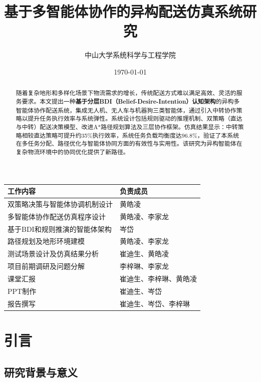 \documentclass[12pt,a4paper]{article}
\title{基于多智能体协作的异构配送仿真系统研究}
\author{中山大学系统科学与工程学院}
\date{\today}
\begin{document}
\maketitle

\begin{table}[h]
\centering

\label{tab:team-division}
\begin{tabular}{|>{\centering\arraybackslash}p{6cm}|>{\centering\arraybackslash}p{8cm}|}
\hline
\textbf{工作内容} & \textbf{负责成员} \\
\hline
\rowcolor{lightgray}
双策略决策与智能体协调机制设计 & 黄皓凌 \\
\hline
多智能体协作配送仿真程序设计 & 黄皓凌、李家龙 \\
\hline
\rowcolor{lightgray}
基于BDI和规则推演的智能体架构 & 岑岱 \\
\hline
路径规划及地形环境建模 & 黄皓凌、李家龙 \\
\hline
\rowcolor{lightgray}
测试场景设计及仿真结果分析 & 崔迪生、黄皓凌 \\
\hline
项目前期调研及问题分解 & 李梓琳、李家龙 \\
\hline
\rowcolor{lightgray}
课堂汇报 & 崔迪生、李梓琳、黄皓凌 \\
\hline
PPT制作 & 崔迪生、岑岱 \\
\hline
\rowcolor{lightgray}
报告撰写 & 崔迪生、岑岱、李梓琳 \\
\hline
\end{tabular}
\end{table}

\begin{abstract}
随着复杂地形和多样化场景下物流需求的增长，传统配送方式难以满足高效、灵活的服务要求。本文提出一种\textbf{基于分层BDI（Belief-Desire-Intention）认知架构}的异构多智能体协作配送系统，集成无人机、无人车与机器狗三类智能体，通过引入中转协作策略以提升任务执行效率与系统弹性。系统设计包括规则驱动的推理机制、双策略（直达与中转）配送决策模型、改进A*路径规划算法及三层协作框架。仿真结果显示：中转策略相较直达策略可提升约35\%执行效率，系统任务负载均衡度达96.8\%，验证了本系统在多任务分配、路径优化与智能体协同方面的有效性与实用性。该研究为异构智能体在复杂物流环境中的协同优化提供了新路径。
\end{abstract}
\clearpage
\tableofcontents
\newpage

\section{引言}

\subsection{研究背景与意义}
\end{document}
